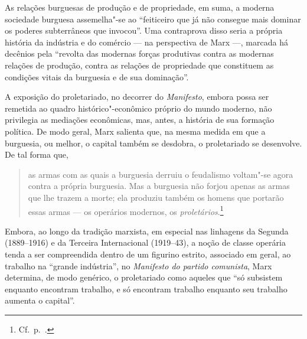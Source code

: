 As relações burguesas de produção e de propriedade, em suma, a moderna
sociedade burguesa assemelha"-se ao “feiticeiro que já não consegue mais
dominar os poderes subterrâneos que invocou”. Uma contraprova disso
seria a própria história da indústria e do comércio --- na perspectiva de
Marx ---, marcada há decênios pela “revolta das modernas forças
produtivas contra as modernas relações de produção, contra as relações
de propriedade que constituem as condições vitais da burguesia e de sua
dominação”.


A exposição do proletariado, no decorrer do \textit{Manifesto}, embora
possa ser remetida ao quadro histórico"-econômico próprio do mundo
moderno, não privilegia as mediações econômicas, mas, antes, a história
de sua formação política. De modo geral, Marx salienta que, na mesma
medida em que a burguesia, ou melhor, o capital também se desdobra, o
proletariado se desenvolve. De tal forma que,

\begin{quote} 
as armas com as quais a burguesia derruiu o feudalismo voltam"-se agora
contra a própria burguesia. Mas a burguesia não forjou apenas as armas que
lhe trazem a morte; ela produziu também os homens que portarão essas
armas --- os operários modernos, os \textit{proletários}.\footnote{ Cf.~p.~\pageref{4}.}
\end{quote} 

Embora, ao longo da tradição marxista, em especial nas linhagens da
Segunda (1889--1916) e da Terceira Internacional (1919--43), a noção de classe operária tenda
a ser compreendida dentro de um figurino estrito, associado em geral,
ao trabalho na “grande indústria”, no \textit{Manifesto do partido
comunista}, Marx determina, de modo genérico, o proletariado como
aqueles que “só subsistem enquanto encontram trabalho, e só encontram
trabalho enquanto seu trabalho aumenta o capital”. 

